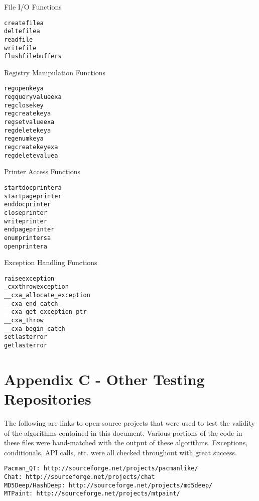 \documentclass{article}
\begin{document}
\begin{algorithm}
\lstset{language=[mips]Assembler}
\caption{File I/O Functions}
\begin{lstlisting}
createfilea
deltefilea
readfile
writefile
flushfilebuffers
\end{lstlisting}
\end{algorithm}

\begin{algorithm}
\lstset{language=[mips]Assembler}
\caption{Registry Manipulation Functions}
\begin{lstlisting}
regopenkeya
regqueryvalueexa
regclosekey
regcreatekeya
regsetvalueexa
regdeletekeya
regenumkeya
regcreatekeyexa
regdeletevaluea
\end{lstlisting}
\end{algorithm}
\begin{algorithm}
\lstset{language=[mips]Assembler}
\caption{Printer Access Functions}
\begin{lstlisting}
startdocprintera
startpageprinter
enddocprinter
closeprinter
writeprinter
endpageprinter
enumprintersa
openprintera
\end{lstlisting}
\end{algorithm}
\begin{algorithm}
\lstset{language=[mips]Assembler}
\caption{Exception Handling Functions}
\begin{lstlisting}
raiseexception
_cxxthrowexception
__cxa_allocate_exception
__cxa_end_catch
__cxa_get_exception_ptr
__cxa_throw
__cxa_begin_catch
setlasterror
getlasterror
\end{lstlisting}
\end{algorithm}

\pagebreak

\section*{Appendix C - Other Testing Repositories}

The following are links to open source projects that were used to test the validity of the algorithms contained in this document.  Various portions
of the code in these files were hand-matched with the output of these algorithms.  Exceptions, conditionals, API calls, etc. were all checked throughout with great success. \\

\begin{algorithm}
\lstset{language=[mips]Assembler}
\begin{lstlisting}
Pacman_QT: http://sourceforge.net/projects/pacmanlike/
Chat: http://sourceforge.net/projects/chat
MD5Deep/HashDeep: http://sourceforge.net/projects/md5deep/
MTPaint: http://sourceforge.net/projects/mtpaint/
\end{lstlisting}
\end{algorithm}
\end{document}
